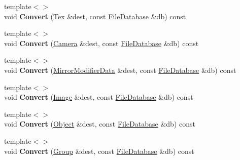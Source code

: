\begin{DoxyCompactItemize}
\item 
\hypertarget{class_assimp_1_1_blender_1_1_structure_abe2812371402e56e8330761665f6b89f}{{\footnotesize template$<$$>$ }\\void {\bfseries Convert} (\hyperlink{struct_assimp_1_1_blender_1_1_tex}{Tex} \&dest, const \hyperlink{class_assimp_1_1_blender_1_1_file_database}{File\+Database} \&db) const }\label{class_assimp_1_1_blender_1_1_structure_abe2812371402e56e8330761665f6b89f}

\item 
\hypertarget{class_assimp_1_1_blender_1_1_structure_a2ab2e7f2fb929651cf7b401a9ee9319e}{{\footnotesize template$<$$>$ }\\void {\bfseries Convert} (\hyperlink{struct_assimp_1_1_blender_1_1_camera}{Camera} \&dest, const \hyperlink{class_assimp_1_1_blender_1_1_file_database}{File\+Database} \&db) const }\label{class_assimp_1_1_blender_1_1_structure_a2ab2e7f2fb929651cf7b401a9ee9319e}

\item 
\hypertarget{class_assimp_1_1_blender_1_1_structure_aac710eb07a490ddcf70aef2882840129}{{\footnotesize template$<$$>$ }\\void {\bfseries Convert} (\hyperlink{struct_assimp_1_1_blender_1_1_mirror_modifier_data}{Mirror\+Modifier\+Data} \&dest, const \hyperlink{class_assimp_1_1_blender_1_1_file_database}{File\+Database} \&db) const }\label{class_assimp_1_1_blender_1_1_structure_aac710eb07a490ddcf70aef2882840129}

\item 
\hypertarget{class_assimp_1_1_blender_1_1_structure_ad067f1a405e01e8dd8f2e7e3b1cf8263}{{\footnotesize template$<$$>$ }\\void {\bfseries Convert} (\hyperlink{struct_assimp_1_1_blender_1_1_image}{Image} \&dest, const \hyperlink{class_assimp_1_1_blender_1_1_file_database}{File\+Database} \&db) const }\label{class_assimp_1_1_blender_1_1_structure_ad067f1a405e01e8dd8f2e7e3b1cf8263}

\item 
\hypertarget{class_assimp_1_1_blender_1_1_structure_a5c01ea901e59fc4d790cd5fc99d66f32}{{\footnotesize template$<$$>$ }\\void {\bfseries Convert} (\hyperlink{struct_assimp_1_1_blender_1_1_object}{Object} \&dest, const \hyperlink{class_assimp_1_1_blender_1_1_file_database}{File\+Database} \&db) const }\label{class_assimp_1_1_blender_1_1_structure_a5c01ea901e59fc4d790cd5fc99d66f32}

\item 
\hypertarget{class_assimp_1_1_blender_1_1_structure_aef8daf0da3af48a2c6f5ede04abdfe7d}{{\footnotesize template$<$$>$ }\\void {\bfseries Convert} (\hyperlink{struct_assimp_1_1_blender_1_1_group}{Group} \&dest, const \hyperlink{class_assimp_1_1_blender_1_1_file_database}{File\+Database} \&db) const }\label{class_assimp_1_1_blender_1_1_structure_aef8daf0da3af48a2c6f5ede04abdfe7d}


\end{DoxyCompactItemize}
